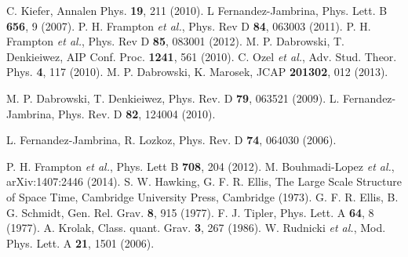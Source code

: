 \documentclass[11pt]{article}
\theoremstyle{theorem}
\theoremstyle{defi}
\begin{document}
\begin{thebibliography}{99}
 C. Kiefer, Annalen Phys. \textbf{19}, 211 (2010).
 L Fernandez-Jambrina, Phys. Lett. B \textbf{656}, 9 (2007).
 P. H. Frampton \emph{et al.}, Phys. Rev D \textbf{84}, 063003 (2011).
 P. H. Frampton \emph{et al.}, Phys. Rev D \textbf{85}, 083001 (2012).
 M. P. Dabrowski, T. Denkieiwez, AIP Conf. Proc. \textbf{1241}, 561 (2010).
 C. Ozel \emph{et al.}, Adv. Stud. Theor. Phys. \textbf{4}, 117 (2010).
 M. P. Dabrowski, K. Marosek, JCAP \textbf{201302}, 012 (2013).

 M. P. Dabrowski, T. Denkieiwez, Phys. Rev. D \textbf{79}, 063521 (2009).
 L. Fernandez-Jambrina, Phys. Rev. D \textbf{82}, 124004 (2010).

 L. Fernandez-Jambrina, R. Lozkoz, Phys. Rev. D \textbf{74}, 064030 (2006).

 P. H. Frampton \emph{et al.}, Phys. Lett B \textbf{708}, 204 (2012).
 M. Bouhmadi-Lopez \emph{et al.}, arXiv:1407:2446 (2014).
 S. W. Hawking, G. F. R. Ellis, The Large Scale Structure of Space Time, Cambridge University Press, Cambridge (1973).
 G. F. R. Ellis, B. G. Schmidt, Gen. Rel. Grav. \textbf{8}, 915 (1977).
 F. J. Tipler, Phys. Lett. A \textbf{64}, 8 (1977).
 A. Krolak, Class. quant. Grav. \textbf{3}, 267 (1986).
 W. Rudnicki \emph{et al.}, Mod. Phys. Lett. A \textbf{21}, 1501 (2006).
\end{thebibliography}
\end{document}
